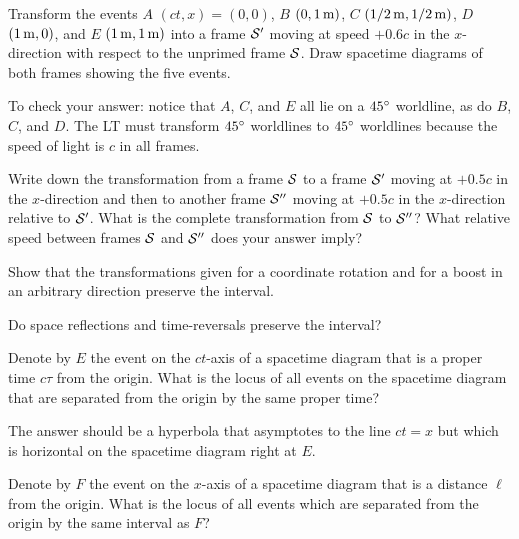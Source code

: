\begin{problem}
Transform the events $A$ $(ct,x)=(0,0)$, $B$ $(0,1\,{\rm m})$, $C$
$(1/2\,{\rm m},1/2\,{\rm m})$, $D$ $(1\,{\rm m},0)$, and $E$ $(1\,{\rm
m},1\,{\rm m})$ into a frame $\cal S'$ moving at speed $+0.6c$ in the
$x$-direction with respect to the unprimed frame $\cal S$.  Draw
spacetime diagrams of both frames showing the five events.
\end{problem}

To check your answer: notice that $A$, $C$, and $E$ all lie on a
$45^{\circ}$ worldline, as do $B$, $C$, and $D$.  The LT must transform
$45^{\circ}$ worldlines to $45^{\circ}$ worldlines because the speed of
light is $c$ in all frames.

\begin{problem}
Write down the transformation from a frame $\cal S$ to a frame $\cal
S'$ moving at $+0.5c$ in the $x$-direction and then to another frame
$\cal S''$ moving at $+0.5c$ in the $x$-direction relative to $\cal
S'$.  What is the complete transformation from $\cal S$ to $\cal S''$?
What relative speed between frames $\cal S$ and $\cal S''$ does your
answer imply?
\end{problem}

\begin{problem}
Show that the transformations given for a coordinate rotation
and for a boost in an arbitrary direction preserve the interval.
\end{problem}

\begin{problem}
Do space reflections and time-reversals preserve the interval?
\end{problem}

\begin{problem}
Denote by $E$ the event on the $ct$-axis of a spacetime diagram
that is a proper time $c\tau$ from the origin.  What is the locus of
all events on the spacetime diagram that are separated from the origin
by the same proper time?
\end{problem}

The answer should be a hyperbola that asymptotes to the line $ct=x$
but which is horizontal on the spacetime diagram right at $E$.

\begin{problem}
Denote by $F$ the event on the $x$-axis of a spacetime diagram that is
a distance $\ell$ from the origin.  What is the locus of all events
which are separated from the origin by the same interval as $F$?
\end{problem}


